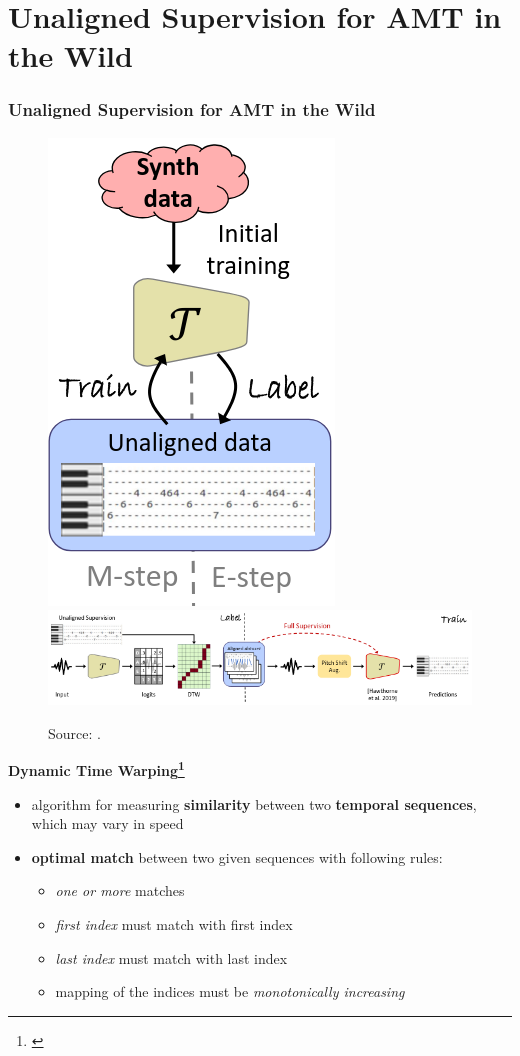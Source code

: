 \documentclass{beamer}
\newcommand{\emp}[1]{\textcolor{tum}{\textbf{#1}}}
\begin{document}

\section{Unaligned Supervision for AMT in the Wild}
\begin{frame}[allowframebreaks]
	\frametitle{Unaligned Supervision for AMT in the Wild}

	\begin{figure}[!ht]
		\centering
		\includegraphics[width=.2\textwidth]{AMT-general.png}%
		\label{fig:AMT-general}
		\includegraphics[width=.9\textwidth]{AMT-scheme.png}%
		\label{fig:AMT-scheme}
		\caption{Source: \cite{AMT}.}
	\end{figure}

	\framebreak

	\emp{Dynamic Time Warping\footnote{\cite{DWT}}}

	\begin{itemize}
		\item algorithm for measuring \textbf{similarity} between two \textbf{temporal sequences}, which may vary in speed
		\item \textbf{optimal match} between two given sequences with following rules:

		      \begin{itemize}
			      \item \textit{one or more} matches
			      \item \textit{first index} must match with first index
			      \item \textit{last index} must match with last index
			      \item mapping of the indices must be \textit{monotonically increasing}
		      \end{itemize}


\end{itemize}
\end{frame}
\end{document}
